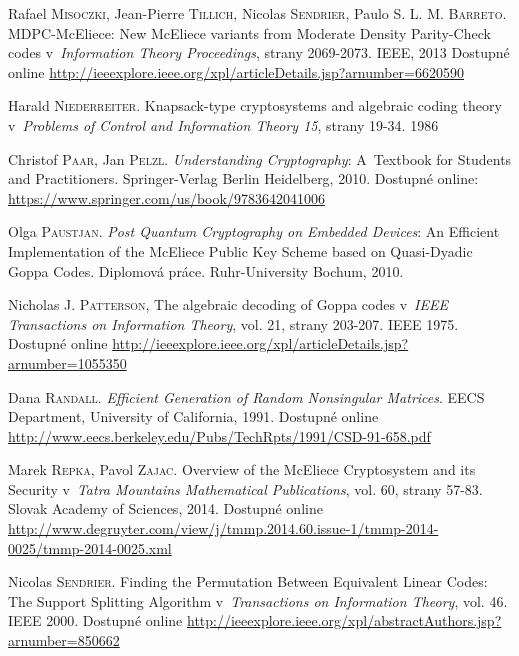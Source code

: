 \documentclass[thesis=M,czech,hidelinks]{FITthesis}[2012/06/26]
\newcommand{\0}{{\textcolor[gray]{0.75}{0}}}
\begin{document}
\begin{thebibliography}{99}
        Rafael \textsc{Misoczki}, Jean-Pierre \textsc{Tillich}, Nicolas
        \textsc{Sendrier}, Paulo S. L. M. \textsc{Barreto}. MDPC-McEliece: New
        McEliece variants from Moderate Density Parity-Check codes
        v~\emph{Information Theory Proceedings}, strany 2069-2073. IEEE, 2013
        Dostupné online
        \url{http://ieeexplore.ieee.org/xpl/articleDetails.jsp?arnumber=6620590}

        Harald \textsc{Niederreiter}. Knapsack-type cryptosystems and
        algebraic coding theory v~\emph{Problems of Control and Information
        Theory 15}, strany 19-34. 1986

        Christof \textsc{Paar}, Jan \textsc{Pelzl}. \emph{Understanding
        Cryptography}: A~Textbook for Students and Practitioners.
        Springer-Verlag Berlin Heidelberg, 2010. Dostupné
        online: \url{https://www.springer.com/us/book/9783642041006}

        Olga \textsc{Paustjan}. \emph{Post Quantum Cryptography on Embedded
        Devices}: An Efficient Implementation of the McEliece Public Key Scheme
        based on Quasi-Dyadic Goppa Codes. Diplomová práce. Ruhr-University
        Bochum, 2010.


        Nicholas J. \textsc{Patterson}, The algebraic decoding of Goppa codes
        v~\emph{IEEE Transactions on Information Theory}, vol. 21, strany
        203-207. IEEE 1975. Dostupné online
        \url{http://ieeexplore.ieee.org/xpl/articleDetails.jsp?arnumber=1055350}

        Dana \textsc{Randall}. \emph{Efficient Generation of Random Nonsingular
        Matrices}. EECS Department, University of California, 1991. Dostupné
        online
        \url{http://www.eecs.berkeley.edu/Pubs/TechRpts/1991/CSD-91-658.pdf}

        Marek \textsc{Repka}, Pavol \textsc{Zajac}. Overview of the McEliece
        Cryptosystem and its Security v~\emph{Tatra Mountains Mathematical
        Publications}, vol. 60, strany 57-83. Slovak Academy of Sciences, 2014.
        Dostupné online
        \url{http://www.degruyter.com/view/j/tmmp.2014.60.issue-1/tmmp-2014-0025/tmmp-2014-0025.xml}

        Nicolas \textsc{Sendrier}. Finding the Permutation Between Equivalent
        Linear Codes: The Support Splitting Algorithm v~\emph{Transactions on
        Information Theory}, vol. 46. IEEE 2000. Dostupné online
        \url{http://ieeexplore.ieee.org/xpl/abstractAuthors.jsp?arnumber=850662}


\end{thebibliography}
\end{document}
